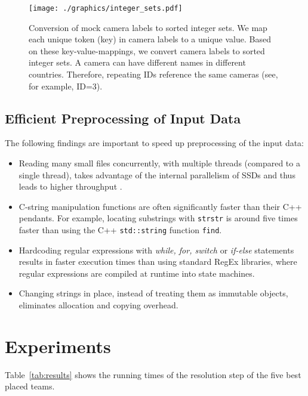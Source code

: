\documentclass[sigconf]{acmart}
\begin{document}
\begin{figure}[htbp]
  \centering
  \texttt{[image: ./graphics/integer\_sets.pdf]}
  \caption{Conversion of mock camera labels to sorted integer sets. 
We map each unique token (key) in camera labels to a unique value. 
Based on these key-value-mappings, we convert camera labels to sorted integer sets. 
A camera can have different names in different countries. Therefore, repeating IDs reference the same cameras (see, for example, ID=3).} 
  \label{fig:integer:sets}
\end{figure}

\subsection{Efficient Preprocessing of Input Data}
\label{sub:sec:preprocessing}

The following findings are important to speed up preprocessing of the input data:

\begin{itemize}
\item Reading many small files concurrently, with multiple threads (compared to a single thread), takes advantage of the internal parallelism of SSDs and thus leads to higher throughput \cite{Zhuang2016}.

\item C-string manipulation functions are often significantly faster than their C++ pendants. For example, locating substrings with \texttt{strstr} is around five times faster than using the C++ \texttt{std::string} function \texttt{find}.

\item Hardcoding regular expressions with \emph{while, for, switch} or \emph{if-else} statements results in faster execution times than using standard RegEx libraries, where regular expressions are compiled at runtime into state machines.

\item Changing strings in place, instead of treating them as immutable objects, eliminates allocation and copying overhead.

\end{itemize}


\section{Experiments}

Table~\ref{tab:results} shows the running times of the resolution step of the five best placed teams.
\end{document}
